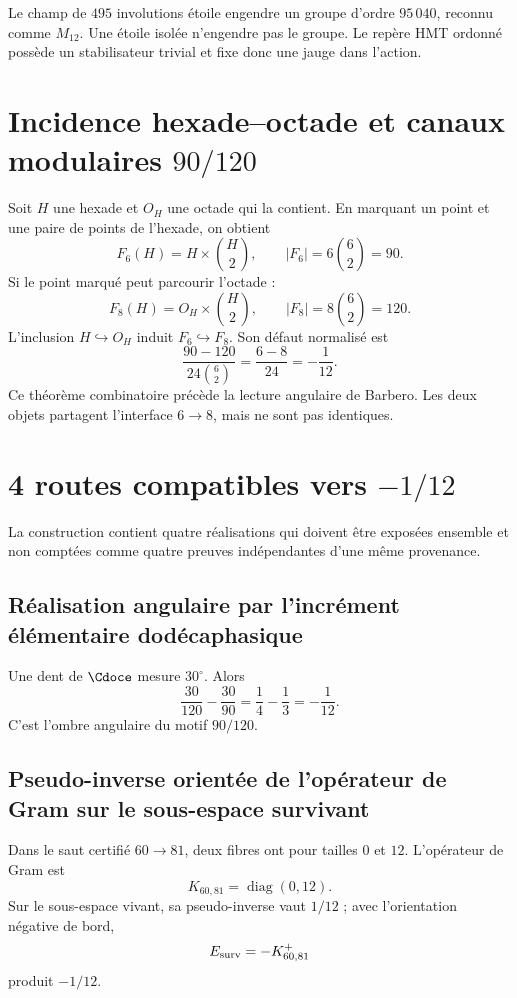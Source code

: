 Le champ de \(495\) involutions étoile engendre un groupe d’ordre
\(95\,040\), reconnu comme \(M_{12}\). Une étoile isolée n’engendre pas le
groupe. Le repère HMT ordonné possède un stabilisateur trivial et fixe donc une
jauge dans l’action.

\section{Incidence hexade--octade et canaux modulaires \(90/120\)}

Soit \(H\) une hexade et \(O_H\) une octade qui la contient. En marquant un point
et une paire de points de l’hexade, on obtient
\[
F_6(H)=H\times\binom H2,
\qquad
|F_6|=6\binom62=90.
\]
Si le point marqué peut parcourir l’octade :
\[
F_8(H)=O_H\times\binom H2,
\qquad
|F_8|=8\binom62=120.
\]
L’inclusion \(H\hookrightarrow O_H\) induit \(F_6\hookrightarrow F_8\).
Son défaut normalisé est
\[
\boxed{
\frac{90-120}{24\binom62}
=\frac{6-8}{24}
=-\frac1{12}.}
\]
Ce théorème combinatoire précède la lecture angulaire de Barbero. Les
deux objets partagent l’interface \(6\to8\), mais ne sont pas identiques.

\section{4 routes compatibles vers \texorpdfstring{\(-1/12\)}{-1/12}}

La construction contient quatre réalisations qui doivent être exposées ensemble et non
comptées comme quatre preuves indépendantes d’une même provenance.

\subsection{Réalisation angulaire par l’incrément élémentaire dodécaphasique}

Une dent de \(\Cdoce\) mesure \(30^\circ\). Alors
\[
\frac{30}{120}-\frac{30}{90}
=\frac14-\frac13
=-\frac1{12}.
\]
C’est l’ombre angulaire du motif \(90/120\).

\subsection{Pseudo-inverse orientée de l’opérateur de Gram sur le sous-espace survivant}

Dans le saut certifié \(60\to81\), deux fibres ont pour tailles \(0\) et
\(12\). L’opérateur de Gram est
\[
K_{60,81}=\operatorname{diag}(0,12).
\]
Sur le sous-espace vivant, sa pseudo-inverse vaut \(1/12\) ; avec l’orientation
négative de bord,
\[
E_{\rm surv}=-K_{60,81}^{+}
\]
produit \(-1/12\).

